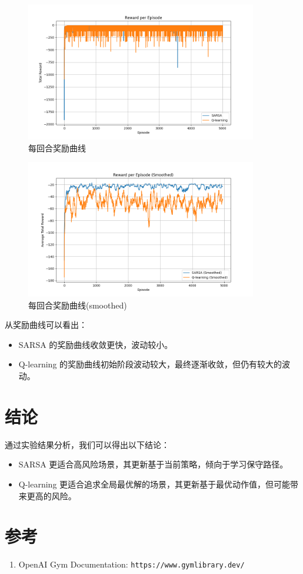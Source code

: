 \documentclass{article}
\begin{document}
\begin{figure}[h!]
    \centering
    \includegraphics[width=0.9\textwidth]{reward_curve.png}
    \caption{每回合奖励曲线}
    \label{fig:reward_curve}
\end{figure}
\begin{figure}[H]
    \centering
    \includegraphics[width=0.9\textwidth]{reward_curve_smoothed.png}
    \caption{每回合奖励曲线(smoothed)}
    \label{fig:reward_curve_smoothed}
\end{figure}

从奖励曲线可以看出：
\begin{itemize}
    \item SARSA 的奖励曲线收敛更快，波动较小。
    \item Q-learning 的奖励曲线初始阶段波动较大，最终逐渐收敛，但仍有较大的波动。
\end{itemize}

\section{结论}
通过实验结果分析，我们可以得出以下结论：
\begin{itemize}
    \item SARSA 更适合高风险场景，其更新基于当前策略，倾向于学习保守路径。
    \item Q-learning 更适合追求全局最优解的场景，其更新基于最优动作值，但可能带来更高的风险。
\end{itemize}

\section*{参考}
\begin{enumerate}
    \item OpenAI Gym Documentation: \texttt{https://www.gymlibrary.dev/}
\end{enumerate}
\end{document}

